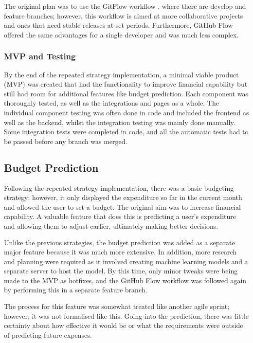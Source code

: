 The original plan was to use the GitFlow workflow \cite{GitFlow}, where there are develop and feature branches; however, this workflow is aimed at more collaborative projects and ones that need stable releases at set periods. Furthermore, GitHub Flow offered the same advantages for a single developer and was much less complex.

\subsubsection{MVP and Testing}
By the end of the repeated strategy implementation, a minimal viable product (MVP) was created that had the functionality to improve financial capability but still had room for additional features like budget prediction. Each component was thoroughly tested, as well as the integrations and pages as a whole. The individual component testing was often done in code and included the frontend as well as the backend, whilst the integration testing was mainly done manually. Some integration tests were completed in code, and all the automatic tests had to be passed before any branch was merged.

\subsection{Budget Prediction}
Following the repeated strategy implementation, there was a basic budgeting strategy; however, it only displayed the expenditure so far in the current month and allowed the user to set a budget. The original aim was to increase financial capability. A valuable feature that does this is predicting a user's expenditure and allowing them to adjust earlier, ultimately making better decisions.

Unlike the previous strategies, the budget prediction was added as a separate major feature because it was much more extensive. In addition, more research and planning were required as it involved creating machine learning models and a separate server to host the model. By this time, only minor tweaks were being made to the MVP as hotfixes, and the GitHub Flow workflow was followed again by performing this in a separate feature branch.

The process for this feature was somewhat treated like another agile sprint; however, it was not formalised like this. Going into the prediction, there was little certainty about how effective it would be or what the requirements were outside of predicting future expenses.

